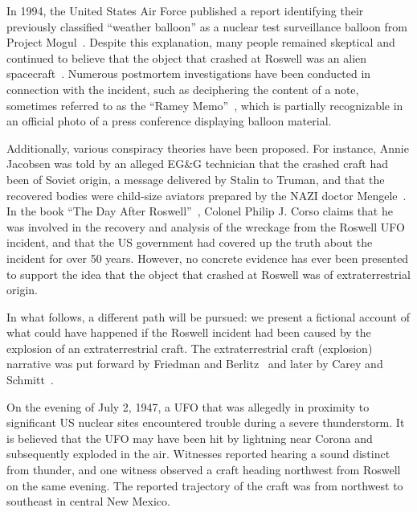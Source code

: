 In 1994, the United States Air Force published a report identifying their previously classified ``weather balloon''
as a nuclear test surveillance balloon from Project Mogul~\cite{Weaver1995Jan,Korff1997Apr}.
Despite this explanation, many people remained skeptical and continued to believe that the object that crashed at Roswell
was an alien spacecraft~\cite{Randle_2022}.
Numerous postmortem investigations have been conducted in connection with the incident, such as deciphering the content of a note,
sometimes referred to as the ``Ramey Memo''~\cite{Houran2002Mar}, 
which is partially recognizable in an official photo of a press conference displaying balloon material.

Additionally, various conspiracy theories have been proposed.
For instance, Annie Jacobsen was told by an alleged EG{\&}G technician that the crashed craft had been of
Soviet origin, a message delivered by Stalin to Truman, and that the recovered bodies were child-size aviators
prepared by the NAZI doctor Mengele~\cite[Chapter~21]{Jacobsen2011}.
In the book ``The Day After Roswell''~\cite{Corso1998Jun}, Colonel Philip J. Corso
claims that he was involved in the recovery and analysis of the wreckage from the Roswell UFO incident,
and that the US government had covered up the truth about the incident for over 50 years.
However, no concrete evidence has ever been presented to support the idea that the object
that crashed at Roswell was of extraterrestrial origin.



In what follows, a different path will be pursued: we present a fictional account of what could have happened if the Roswell incident had been caused by the explosion of an extraterrestrial craft. The extraterrestrial craft (explosion) narrative was put forward by Friedman and Berlitz~\cite{Berlitz-Roswell,Friedman-Roswell} and later by Carey and Schmitt~\cite{CareySchmitt}.

On the evening of July 2, 1947, a UFO that was allegedly in proximity to significant US nuclear sites encountered trouble during a severe thunderstorm. It is believed that the UFO may have been hit by lightning near Corona and subsequently exploded in the air. Witnesses reported hearing a sound distinct from thunder, and one witness observed a craft heading northwest from Roswell on the same evening. The reported trajectory of the craft was from northwest to southeast in central New Mexico.

